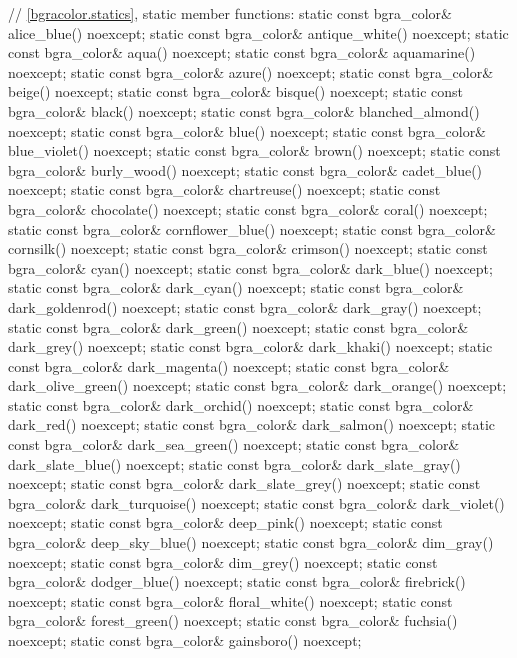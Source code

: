 \begin{codeblock}
{{{    // \ref{bgracolor.statics}, static member functions:
    static const bgra_color& alice_blue() noexcept;
    static const bgra_color& antique_white() noexcept;
    static const bgra_color& aqua() noexcept;
    static const bgra_color& aquamarine() noexcept;
    static const bgra_color& azure() noexcept;
    static const bgra_color& beige() noexcept;
    static const bgra_color& bisque() noexcept;
    static const bgra_color& black() noexcept;
    static const bgra_color& blanched_almond() noexcept;
    static const bgra_color& blue() noexcept;
    static const bgra_color& blue_violet() noexcept;
    static const bgra_color& brown() noexcept;
    static const bgra_color& burly_wood() noexcept;
    static const bgra_color& cadet_blue() noexcept;
    static const bgra_color& chartreuse() noexcept;
    static const bgra_color& chocolate() noexcept;
    static const bgra_color& coral() noexcept;
    static const bgra_color& cornflower_blue() noexcept;
    static const bgra_color& cornsilk() noexcept;
    static const bgra_color& crimson() noexcept;
    static const bgra_color& cyan() noexcept;
    static const bgra_color& dark_blue() noexcept;
    static const bgra_color& dark_cyan() noexcept;
    static const bgra_color& dark_goldenrod() noexcept;
    static const bgra_color& dark_gray() noexcept;
    static const bgra_color& dark_green() noexcept;
    static const bgra_color& dark_grey() noexcept;
    static const bgra_color& dark_khaki() noexcept;
    static const bgra_color& dark_magenta() noexcept;
    static const bgra_color& dark_olive_green() noexcept;
    static const bgra_color& dark_orange() noexcept;
    static const bgra_color& dark_orchid() noexcept;
    static const bgra_color& dark_red() noexcept;
    static const bgra_color& dark_salmon() noexcept;
    static const bgra_color& dark_sea_green() noexcept;
    static const bgra_color& dark_slate_blue() noexcept;
    static const bgra_color& dark_slate_gray() noexcept;
    static const bgra_color& dark_slate_grey() noexcept;
    static const bgra_color& dark_turquoise() noexcept;
    static const bgra_color& dark_violet() noexcept;
    static const bgra_color& deep_pink() noexcept;
    static const bgra_color& deep_sky_blue() noexcept;
    static const bgra_color& dim_gray() noexcept;
    static const bgra_color& dim_grey() noexcept;
    static const bgra_color& dodger_blue() noexcept;
    static const bgra_color& firebrick() noexcept;
    static const bgra_color& floral_white() noexcept;
    static const bgra_color& forest_green() noexcept;
    static const bgra_color& fuchsia() noexcept;
    static const bgra_color& gainsboro() noexcept;
}}}
\end{codeblock}
